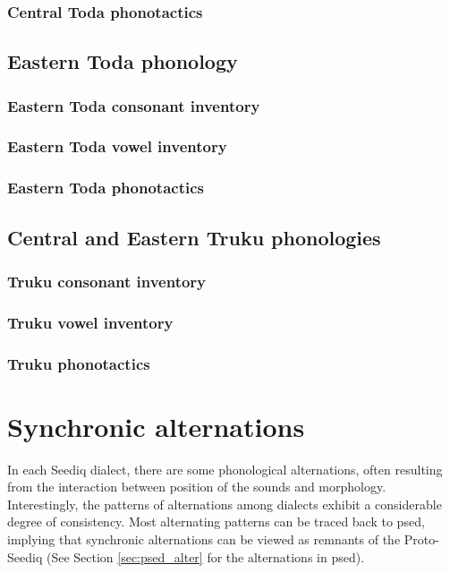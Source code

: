 \subsubsection{Central Toda phonotactics}
\lipsum[1-5]

\subsection{Eastern Toda phonology}
\lipsum[1]

\subsubsection{Eastern Toda consonant inventory}
\lipsum[1-3]

\subsubsection{Eastern Toda vowel inventory}
\lipsum[1-3]

\subsubsection{Eastern Toda phonotactics}
\lipsum[1-3]

\subsection{Central and Eastern Truku phonologies}
\lipsum[1]

\subsubsection{Truku consonant inventory}
\lipsum[1-3]
\subsubsection{Truku vowel inventory}
\lipsum[1-3]
\subsubsection{Truku phonotactics}
\lipsum[1-3]

\section{Synchronic alternations} \label{sec:3.2}

In each Seediq dialect, there are some phonological alternations, often resulting from the interaction between position of the sounds and morphology. Interestingly, the patterns of alternations among dialects exhibit a considerable degree of consistency. Most alternating patterns can be traced back to \acl{psed}, implying that synchronic alternations can be viewed as remnants of the Proto-Seediq (See Section \ref{sec:psed_alter} for the alternations in \acl{psed}).

